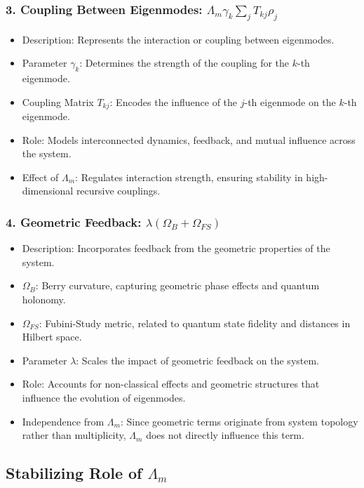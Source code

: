 \documentclass{article}
\theoremstyle{plain}
\begin{document}
\subsubsection{3. Coupling Between Eigenmodes: \( \Lambda_m \gamma_k \sum_j T_{kj} \rho_j \)}
\begin{itemize}
    \item Description: Represents the interaction or coupling between eigenmodes.
    \item Parameter \( \gamma_k \): Determines the strength of the coupling for the \( k \)-th eigenmode.
    \item Coupling Matrix \( T_{kj} \): Encodes the influence of the \( j \)-th eigenmode on the \( k \)-th eigenmode.
    \item Role: Models interconnected dynamics, feedback, and mutual influence across the system.
    \item Effect of \( \Lambda_m \): Regulates interaction strength, ensuring stability in high-dimensional recursive couplings.
\end{itemize}

\subsubsection{4. Geometric Feedback: \( \lambda (\Omega_B + \Omega_{FS}) \)}
\begin{itemize}
    \item Description: Incorporates feedback from the geometric properties of the system.
    \item \( \Omega_B \): Berry curvature, capturing geometric phase effects and quantum holonomy.
    \item \( \Omega_{FS} \): Fubini-Study metric, related to quantum state fidelity and distances in Hilbert space.
    \item Parameter \( \lambda \): Scales the impact of geometric feedback on the system.
    \item Role: Accounts for non-classical effects and geometric structures that influence the evolution of eigenmodes.
    \item Independence from \( \Lambda_m \): Since geometric terms originate from system topology rather than multiplicity, \( \Lambda_m \) does not directly influence this term.
\end{itemize}

\subsection{Stabilizing Role of \( \Lambda_m \)}
\end{document}
